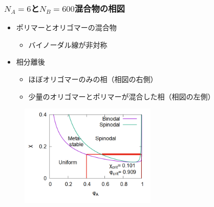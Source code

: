\documentclass[unicode,12pt]{beamer}%
\begin{document}
\begin{frame}\frametitle{$N_A = 6$と$N_B = 600$混合物の相図}
	\begin{itemize}
		\item ポリマーとオリゴマーの混合物
		\begin{itemize}
			\item バイノーダル線が非対称
		\end{itemize}
		\item 相分離後
		\begin{itemize}
			\item ほぼオリゴマーのみの相（相図の右側）
			\item 少量のオリゴマーとポリマーが混合した相（相図の左側）
		\end{itemize}
	\end{itemize}

	\vspace{-0.5\baselineskip}
	\begin{figure}[htbp]
		\begin{center}
			\includegraphics[width=65mm]{PD_6_600_4.png}
		\end{center}
	\end{figure}
\end{frame}
\end{document}
